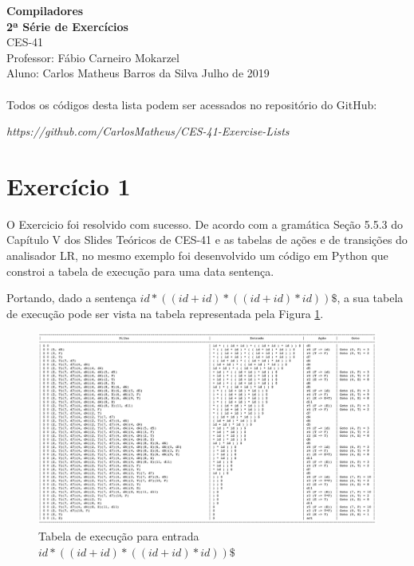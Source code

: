 \documentclass[a4paper, 10pt]{article}
\begin{document}
\noindent
\large
\textbf{Compiladores} \\
\textbf{2ª Série de Exercícios} \\
\normalsize CES-41  \\
Professor: Fábio Carneiro Mokarzel \\
Aluno: Carlos Matheus Barros da Silva \hfill Julho de 2019 \\ \\


Todos os códigos desta lista podem ser acessados no repositório do GitHub:

\textit{https://github.com/CarlosMatheus/CES-41-Exercise-Lists}

\section*{Exercício 1}

O Exercicio foi resolvido com sucesso. De acordo com a gramática Seção 5.5.3 do Capítulo V dos Slides Teóricos de CES-41 e as tabelas de ações e de transições do analisador LR, no mesmo exemplo foi desenvolvido um código em Python que constroi a tabela de execução para uma data sentença.

Portando, dado a sentença $id * ((id + id) * ((id + id) * id)) \$$, a sua tabela de execução pode ser vista na tabela representada pela Figura \ref{fig:tabela}.

\begin{figure}[H]
  \begin{center}
  \includegraphics[width=\linewidth]{./../output/tabela.png}
  \caption{Tabela de execução para entrada $id * ((id + id) * ((id + id) * id)) \$$}
  \label{fig:tabela}
  \end{center}
\end{figure}
\end{document}
